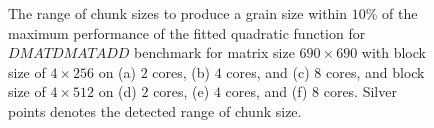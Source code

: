 \begin{figure}[H]
	\hfill
	\caption{The range of chunk sizes to produce a grain size within $10\%$ of the maximum performance of the fitted quadratic function for $DMATDMATADD$ benchmark for matrix size $690\times690$ with block size of $4\times256$ on (a) $2$ cores, (b) $4$ cores, and (c) $8$ cores, and block size of $4\times512$ on (d) $2$ cores, (e) $4$ cores, and (f) $8$ cores. Silver points denotes the detected range of chunk size.}	
	\label{fig14}
\end{figure}

